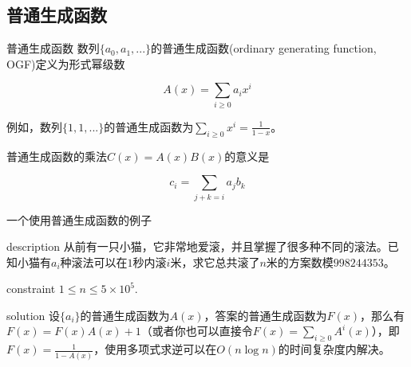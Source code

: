 \documentclass{beamer}
\begin{document}
	\subsection{普通生成函数}
	\begin{frame}{普通生成函数}
		数列$\{a_0,a_1,...\}$的普通生成函数(ordinary generating function, OGF)定义为形式幂级数
		
		$$A(x)=\sum\limits_{i\ge 0}a_ix^i$$
		
		例如，数列$\{1,1,...\}$的普通生成函数为$\sum_{i\ge 0}x^i=\frac{1}{1-x}$。

		普通生成函数的乘法$C(x)=A(x)B(x)$的意义是
		
		$$c_i=\sum_{j+k=i}a_jb_k$$
	\end{frame}
	\begin{frame}{一个使用普通生成函数的例子}
		\begin{block}{description}
			从前有一只小猫，它非常地爱滚，并且掌握了很多种不同的滚法。已知小猫有$a_i$种滚法可以在$1$秒内滚$i$米，求它总共滚了$n$米的方案数模$998244353$。
		\end{block}
		\begin{block}{constraint}
			$1 \le n \le 5\times 10^5.$
		\end{block}
		\pause
		\begin{block}{solution}
			设$\{a_i\}$的普通生成函数为$A(x)$，答案的普通生成函数为$F(x)$，那么有$F(x)=F(x)A(x)+1$（或者你也可以直接令$F(x)=\sum_{i \ge 0}A^i(x)$），即$F(x)=\frac{1}{1-A(x)}$，使用多项式求逆可以在$O(n\log n)$的时间复杂度内解决。
		\end{block}
	\end{frame}
\end{document}
